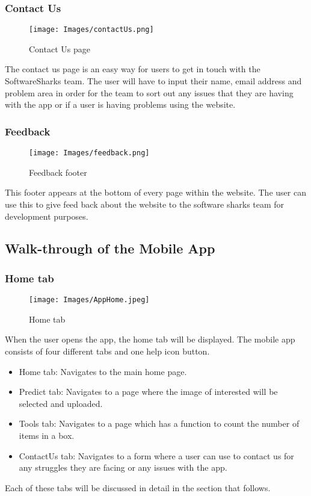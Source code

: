 \documentclass[a4paper, 12pt]{article}
\begin{document}
\subsubsection{Contact Us}
\begin{figure}[!ht]
\texttt{[image: Images/contactUs.png]}
\centering
\caption{Contact Us page} 
\end{figure}
The contact us page is an easy way for users to get in touch with the SoftwareSharks team. The user will have to input their name, email address and problem area in order for the team to sort out any issues that they are having with the app or if a user is having problems using the website.

\subsubsection{Feedback}
\begin{figure}[!ht]
\texttt{[image: Images/feedback.png]}
\centering
\caption{Feedback footer} 
\end{figure}
This footer appears at the bottom of every page within the website. The user can use this to give feed back about the website to the software sharks team for development purposes.

\subsection{Walk-through of the Mobile App}
\subsubsection{Home tab}
\begin{figure}[h!]
\texttt{[image: Images/AppHome.jpeg]}
\centering
\caption{Home tab}
\end{figure}
When the  user opens the app, the home tab will be displayed.
The mobile app consists of four different tabs and one help icon button.
\begin{itemize}
\item Home tab: Navigates to the main home page.
\item Predict tab: Navigates to a page where the image of interested  will be selected and uploaded.
\item Tools tab: Navigates to a page which has a function to count the number of items in a box.
\item ContactUs tab: Navigates to a form where a user can use to contact us for any struggles they are facing or any issues with the app.
\end{itemize}
Each of these tabs will be discussed in detail in the  section that follows.
\pagebreak
\end{document}
